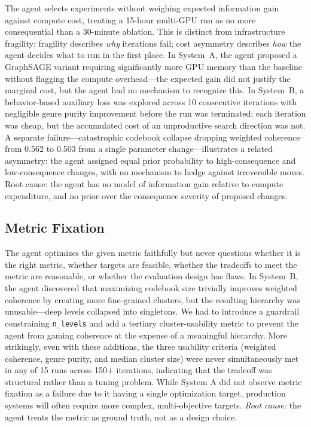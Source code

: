 \documentclass[conference]{IEEEtran}
\begin{document}
The agent selects experiments without weighing expected information 
gain against compute cost, treating a 15-hour multi-GPU run as 
no more consequential than a 30-minute ablation. This is distinct 
from infrastructure fragility: fragility describes \textit{why} iterations fail; cost asymmetry describes \textit{how} the agent decides what to run in the first place. In System~A, the agent proposed a GraphSAGE variant requiring significantly more GPU memory than the baseline without flagging the compute overhead---the expected gain did not justify the marginal cost, but the agent had no mechanism to recognize this. In System~B, a behavior-based auxiliary loss was explored across 10 consecutive iterations with negligible genre purity improvement before the run was terminated; each iteration was cheap, but the accumulated cost of an unproductive search direction was not. A separate failure---catastrophic codebook collapse dropping weighted coherence from 0.562 to 0.503 from a single parameter change---illustrates a related asymmetry: the agent assigned equal prior probability to high-consequence and low-consequence changes, with no mechanism to hedge against irreversible moves. Root cause: the agent has no model of information gain relative to compute expenditure, and no prior over the consequence severity of proposed changes.


\subsection{Metric Fixation}

The agent optimizes the given metric faithfully but never questions whether it is the right metric, whether targets are feasible, whether the tradeoffs to meet the metric are reasonable, or whether the evaluation design has flaws. In System~B, the agent discovered that maximizing codebook size trivially improves weighted coherence by creating more fine-grained clusters, but the resulting hierarchy was unusable---deep levels collapsed into singletons. We had to introduce a guardrail constraining \texttt{n\_levels} and add a tertiary cluster-usability metric to prevent the agent from gaming coherence at the expense of a meaningful hierarchy. More strikingly, even with these additions, the three usability criteria (weighted coherence, genre purity, and median cluster size) were never simultaneously met in any of 15 runs across 150+ iterations, indicating that the tradeoff was structural rather than a tuning problem. While System A did not observe metric fixation as a failure due to it having a single optimization target, production systems will often require more complex, multi-objective targets.  \textit{Root cause:} the agent treats the metric as ground truth, not as a design choice.
\end{document}
